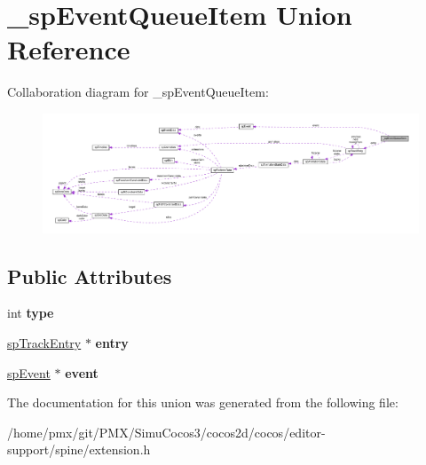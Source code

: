 \hypertarget{union__spEventQueueItem}{}\section{\+\_\+sp\+Event\+Queue\+Item Union Reference}
\label{union__spEventQueueItem}


Collaboration diagram for \+\_\+sp\+Event\+Queue\+Item\+:
\nopagebreak
\begin{figure}[H]
\begin{center}
\leavevmode
\includegraphics[width=350pt]{union__spEventQueueItem__coll__graph}
\end{center}
\end{figure}
\subsection*{Public Attributes}
\begin{DoxyCompactItemize}
\item 
\mbox{\label{union__spEventQueueItem_a86aa66bba26f8efa7acf28a206c8ae65}} 
int {\bfseries type}
\item 
\mbox{\label{union__spEventQueueItem_a93abcab76961e52cd68eafb1a4743d46}} 
\hyperlink{structspTrackEntry}{sp\+Track\+Entry} $\ast$ {\bfseries entry}
\item 
\mbox{\label{union__spEventQueueItem_a0803e7d58cea18458de8b4c8d06817bd}} 
\hyperlink{structspEvent}{sp\+Event} $\ast$ {\bfseries event}
\end{DoxyCompactItemize}


The documentation for this union was generated from the following file\+:\begin{DoxyCompactItemize}
\item 
/home/pmx/git/\+P\+M\+X/\+Simu\+Cocos3/cocos2d/cocos/editor-\/support/spine/extension.\+h\end{DoxyCompactItemize}
